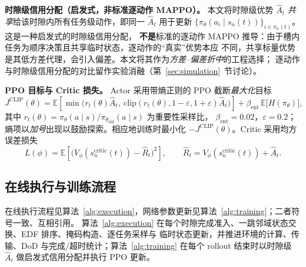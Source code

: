 \documentclass[a4paper,11pt]{article}
\begin{document}
\noindent\textbf{时隙级信用分配（启发式，非标准逐动作 MAPPO）。}
本文将时隙级优势 $\hat{A}_t$ \emph{共享}给该时隙内所有任务级动作，即同一 $\hat{A}_t$ 用于更新
$\{\pi_\theta(a_i\mid s_n(t))\}_{i\in\pi_n(t)}$。这是一种启发式的时隙级信用分配，
\textbf{不是}标准的逐动作 MAPPO 推导：由于槽内任务为顺序决策且共享临时状态，逐动作的``真实''优势本应
不同，共享标量优势是其低方差代理，会引入偏差。本文将其作为\emph{方差--偏差折中}的工程选择；
逐动作与时隙级信用分配的对比留作实验消融（第~\ref{sec:simulation}~节讨论）。

\noindent\textbf{PPO 目标与 Critic 损失。}
Actor 采用带熵正则的 PPO 截断\emph{最大化}目标
\begin{equation}
J^{\mathrm{CLIP}}(\theta) = \mathbb{E}\!\left[
\min\!\big(r_t(\theta)\hat{A}_t,\
\mathrm{clip}(r_t(\theta), 1-\varepsilon, 1+\varepsilon)\hat{A}_t\big)
\right] + \beta_{\mathrm{ent}}\,\mathbb{E}\big[H(\pi_\theta)\big],
\label{eq:ppo}
\end{equation}
其中 $r_t(\theta) = \pi_\theta(a\mid s)/\pi_{\theta_{\mathrm{old}}}(a\mid s)$ 为重要性采样比，
$\beta_{\mathrm{ent}}=0.02$，$\varepsilon=0.2$；熵项以\emph{加号}出现以鼓励探索。相应地训练时最小化
$-J^{\mathrm{CLIP}}(\theta)$。Critic 采用均方误差损失
\begin{equation}
L(\phi) = \mathbb{E}\!\left[
\big(V_\phi(s^{\mathrm{critic}}_n(t)) - \hat{R}_t\big)^2
\right],
\qquad \hat{R}_t = V_\phi(s^{\mathrm{critic}}_n(t)) + \hat{A}_t.
\label{eq:critic_loss}
\end{equation}

\subsection{在线执行与训练流程}
\label{subsec:procedure}

在线执行流程见算法~\ref{alg:execution}，网络参数更新见算法~\ref{alg:training}；二者符号一致、互相引用。
算法~\ref{alg:execution} 在每个时隙完成准入、一跳邻域状态交换、EDF 排序、掩码构造、逐任务采样与
临时状态更新，并推进环境的计算、传输、DoD 与完成/超时统计；算法~\ref{alg:training} 在每个 rollout
结束时以时隙级 $\hat{A}_t$ 做启发式信用分配并执行 PPO 更新。
\end{document}
